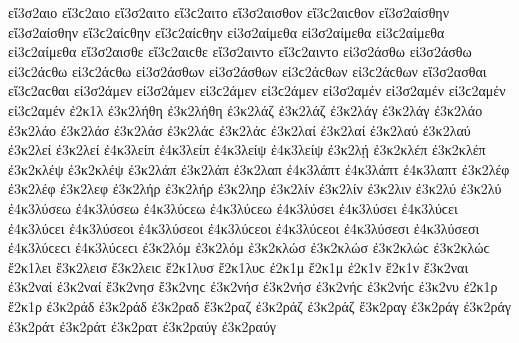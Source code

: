 {εἴ3σ2αιο εἴ3ϲ2αιο 
εἴ3σ2αιτο εἴ3ϲ2αιτο 
εἴ3σ2αισθον εἴ3ϲ2αιϲθον 
εἴ3σ2αίσθην εἴ3σ2αίσθην εἴ3ϲ2αίϲθην εἴ3ϲ2αίϲθην 
εἰ3σ2αίμεθα εἰ3σ2αίμεθα εἰ3ϲ2αίμεθα εἰ3ϲ2αίμεθα 
εἴ3σ2αισθε εἴ3ϲ2αιϲθε 
εἴ3σ2αιντο εἴ3ϲ2αιντο 
%
εἰ3σ2άσθω εἰ3σ2άσθω εἰ3ϲ2άϲθω εἰ3ϲ2άϲθω 
εἰ3σ2άσθων εἰ3σ2άσθων εἰ3ϲ2άϲθων εἰ3ϲ2άϲθων 
%
εἴ3σ2ασθαι εἴ3ϲ2αϲθαι 
εἰ3σ2άμεν εἰ3σ2άμεν εἰ3ϲ2άμεν εἰ3ϲ2άμεν   %
εἰ3σ2αμέν εἰ3σ2αμέν εἰ3ϲ2αμέν εἰ3ϲ2αμέν 
%	
ἐ2κ1λ   %
ἐ3κ2λήθη ἐ3κ2λήθη   %
ἐ3κ2λάζ ἐ3κ2λάζ   %
ἐ3κ2λάγ ἐ3κ2λάγ   %
ἐ3κ2λάο ἐ3κ2λάο   %
ἐ3κ2λάσ ἐ3κ2λάσ ἐ3κ2λάϲ ἐ3κ2λάϲ   %
ἐ3κ2λαί ἐ3κ2λαί   %
ἐ3κ2λαύ ἐ3κ2λαύ   %
ἐ3κ2λεί ἐ3κ2λεί   %
ἐ4κ3λείπ ἐ4κ3λείπ   %
ἐ4κ3λείψ ἐ4κ3λείψ   %
ἐ3κ2λῄ   %
ἐ3κ2κλέπ ἐ3κ2κλέπ   %
ἐ3κ2κλέψ ἐ3κ2κλέψ   %
ἐ3κ2λάπ ἐ3κ2λάπ   %
ἐ3κ2λαπ   %
ἐ4κ3λάπτ ἐ4κ3λάπτ   %
ἐ4κ3λαπτ 
ἐ3κ2λέφ ἐ3κ2λέφ   %
ἐ3κ2λεφ   %
ἐ3κ2λήρ ἐ3κ2λήρ   %
ἐ3κ2ληρ   %
ἐ3κ2λίν ἐ3κ2λίν   %
ἐ3κ2λιν   %
ἐ3κ2λύ ἐ3κ2λύ   %
ἐ4κ3λύσεω ἐ4κ3λύσεω ἐ4κ3λύϲεω ἐ4κ3λύϲεω   %
ἐ4κ3λύσει ἐ4κ3λύσει ἐ4κ3λύϲει ἐ4κ3λύϲει 
ἐ4κ3λύσεοι ἐ4κ3λύσεοι ἐ4κ3λύϲεοι ἐ4κ3λύϲεοι 
ἐ4κ3λύσεσι ἐ4κ3λύσεσι ἐ4κ3λύϲεϲι ἐ4κ3λύϲεϲι 
ἐ3κ2λόμ ἐ3κ2λόμ   %
ἐ3κ2κλώσ ἐ3κ2κλώσ ἐ3κ2κλώϲ ἐ3κ2κλώϲ   %
ἔ2κ1λει   %
ἔ3κ2λεισ ἔ3κ2λειϲ   %
ἔ2κ1λυσ ἔ2κ1λυϲ   %
ἐ2κ1μ 
ἔ2κ1μ 
ἐ2κ1ν 
ἔ2κ1ν 
ἔ3κ2ναι   %
ἐ3κ2ναί ἐ3κ2ναί   %
ἔ3κ2νησ ἔ3κ2νηϲ   %
ἐ3κ2νήσ ἐ3κ2νήσ ἐ3κ2νήϲ ἐ3κ2νήϲ   %
ἐ3κ2νυ   %
ἐ2κ1ρ 
ἔ2κ1ρ 
ἐ3κ2ράδ ἐ3κ2ράδ   %
ἐ3κ2ραδ 
ἔ3κ2ραζ   %
ἐ3κ2ράζ ἐ3κ2ράζ 
ἔ3κ2ραγ   %
ἐ3κ2ράγ ἐ3κ2ράγ 
ἐ3κ2ράτ ἐ3κ2ράτ   %
ἐ3κ2ρατ 
ἐ3κ2ραύγ ἐ3κ2ραύγ   %
}
